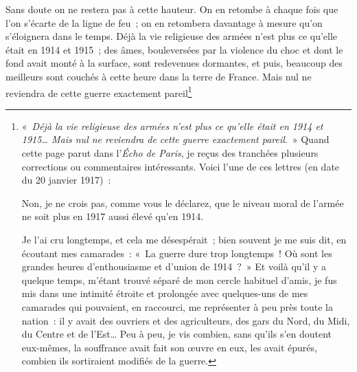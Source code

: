\documentclass[french,twoside]{book} %
\newcommand\chaptercont{} %
\begin{document}
\chaptercont
\noindent Sans doute on ne restera pas à cette hauteur. On en retombe à chaque fois que l’on s’écarte de la ligne de feu ; on en retombera davantage à mesure qu’on s’éloignera dans le temps. Déjà la vie religieuse des armées n’est plus ce qu’elle était en 1914 et 1915 ; des âmes, bouleversées par la violence du choc et dont le fond avait monté à la surface, sont redevenues dormantes, et puis, beaucoup des meilleurs sont couchés à cette heure dans la terre de France. Mais nul ne reviendra de cette guerre exactement pareil\footnote{\noindent « {\itshape Déjà la vie religieuse des armées n’est plus ce qu’elle était en 1914 et 1915… Mais nul ne reviendra de cette guerre exactement pareil}. » Quand cette page parut dans l’{\itshape Écho de Paris}, je reçus des tranchées plusieurs corrections ou commentaires intéressants. Voici l’une de ces lettres (en date du 20 janvier 1917) :‌\par
  \noindent Non, je ne crois pas, comme vous le déclarez, que le niveau moral de l’armée ne soit plus en 1917 aussi élevé qu’en 1914.\par
 Je l’ai cru longtemps, et cela me désespérait ; bien souvent je me suis dit, en écoutant mes camarades : « La guerre dure trop longtemps ! Où sont les grandes heures d’enthousiasme et d’union de 1914 ? » Et voilà qu’il y a quelque temps, m’étant trouvé séparé de mon cercle habituel d’amis, je fus mis dans une intimité étroite et prolongée avec quelques-uns de mes camarades qui pouvaient, en raccourci, me représenter à peu près toute la nation : il y avait des ouvriers et des agriculteurs, des gars du Nord, du Midi, du Centre et de l’Est… Peu à peu, je vis combien, sans qu’ils s’en doutent eux-mêmes, la souffrance avait fait son œuvre en eux, les avait épurés, combien ils sortiraient modifiés de la guerre.‌\par
}
\end{document}
